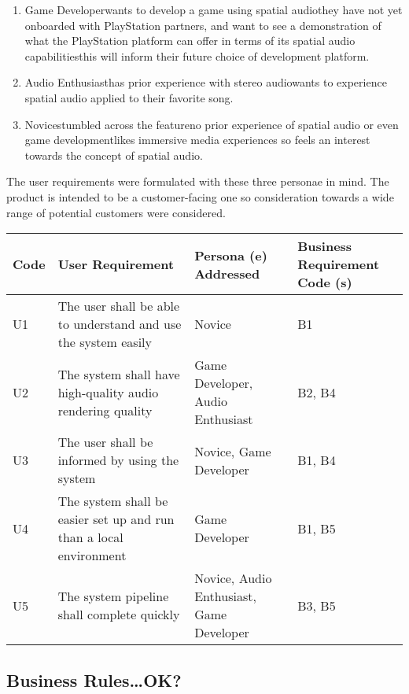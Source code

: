 \begin{enumerate}
    \item Game Developer\textemdash wants to develop a game using spatial audio\textemdash they have not yet onboarded with PlayStation partners, and want to see a demonstration of what the PlayStation platform can offer in terms of its spatial audio capabilities\textemdash this will inform their future choice of development platform.
    \item Audio Enthusiast\textemdash has prior experience with stereo audio\textemdash wants to experience spatial audio applied to their favorite song.
    \item Novice\textemdash stumbled across the feature\textemdash no prior experience of spatial audio or even game development\textemdash likes immersive media experiences so feels an interest towards the concept of spatial audio.
\end{enumerate}

The user requirements were formulated with these three personae in mind.
The product is intended to be a customer-facing one so consideration towards a wide range of potential customers were considered.

\begin{tabularx}{\textwidth}{szzs}
    \caption{User Requirements}\label{tab:user-requirements}\\
    \toprule
    \textbf{Code} & \textbf{User Requirement} & \textbf{Persona (e) Addressed} & \textbf{Business Requirement Code (s)} \\\midrule
    U1 & The user shall be able to understand and use the system easily & Novice & B1 \\\midrule
    U2 & The system shall have high-quality audio rendering quality & Game Developer, Audio Enthusiast & B2, B4 \\\midrule
    U3 & The user shall be informed by using the system & Novice, Game Developer & B1, B4 \\\midrule
    U4 & The system shall be easier set up and run than a local environment & Game Developer & B1, B5 \\\midrule
    U5 & The system pipeline shall complete quickly & Novice, Audio Enthusiast, Game Developer & B3, B5 \\\bottomrule
\end{tabularx}

\subsection{Business Rules\ldots OK?}\label{subsec:business-rules-ok}

